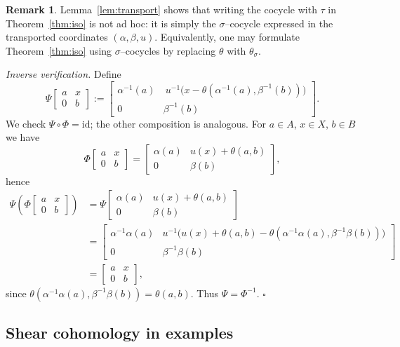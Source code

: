 \documentclass{article}
\theoremstyle{plain}
\theoremstyle{definition}
\newtheorem{remark}[theorem]{Remark}
\begin{document}
\begin{remark}
Lemma~\ref{lem:transport} shows that writing the cocycle with $\tau$ in Theorem~\ref{thm:iso}
is not ad hoc: it is simply the $\sigma$--cocycle expressed in the transported
coordinates $(\alpha,\beta,u)$. Equivalently, one may formulate Theorem~\ref{thm:iso} using
$\sigma$--cocycles by replacing $\theta$ with $\theta_\sigma$.
\end{remark}
\medskip
\noindent\textit{Inverse verification.}
Define
\[
\Psi\!\begin{bmatrix}a&x\\[2pt]0&b\end{bmatrix}
:=\begin{bmatrix}\alpha^{-1}(a)&\ u^{-1}\!\bigl(x-\theta(\alpha^{-1}(a),\beta^{-1}(b))\bigr)\\[2pt]0&\beta^{-1}(b)\end{bmatrix}.
\]
We check $\Psi\circ\Phi=\mathrm{id}$; the other composition is analogous.
For $a\in A$, $x\in X$, $b\in B$ we have
\[
\Phi\!\begin{bmatrix}a&x\\0&b\end{bmatrix}
=\begin{bmatrix}\alpha(a)&u(x)+\theta(a,b)\\0&\beta(b)\end{bmatrix},
\]
hence
\begin{align*}
\Psi\!\left(\Phi\!\begin{bmatrix}a&x\\0&b\end{bmatrix}\right)
&=\Psi\!\begin{bmatrix}\alpha(a)&u(x)+\theta(a,b)\\0&\beta(b)\end{bmatrix}\\
&=\begin{bmatrix}
\alpha^{-1}\alpha(a) &
u^{-1}\!\bigl(u(x)+\theta(a,b)-\theta(\alpha^{-1}\alpha(a),\beta^{-1}\beta(b))\bigr)\\[2pt]
0 & \beta^{-1}\beta(b)
\end{bmatrix}\\
&=\begin{bmatrix}a&x\\0&b\end{bmatrix},
\end{align*}
since $\theta(\alpha^{-1}\alpha(a),\beta^{-1}\beta(b))=\theta(a,b)$. Thus $\Psi=\Phi^{-1}$.
\hfill$\square$

\subsection*{Shear cohomology in examples}
\end{document}
